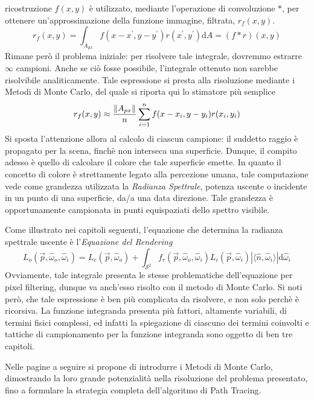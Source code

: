 \documentclass[10pt, openany]{book}
\theoremstyle{theoremdd}
\begin{document}
	ricostruzione $f(x,y)$ \`e utilizzato, mediante l'operazione di convoluzione $*$, per ottenere un'approssimazione della funzione immagine, filtrata,
	$r_f(x,y)$.
	\begin{equation}
		r_f(x,y)=\int_{A_{px}}f(x-x^\prime,y-y^\prime)r(x^\prime,y^\prime)\mathrm{d}A = (f*r)(x,y)
	\end{equation}
	Rimane per\`o il problema iniziale: per risolvere tale integrale, dovremmo estrarre $\infty$ campioni. Anche se ci\`o fosse possibile, l'integrale
	ottenuto non sarebbe risolvibile analiticamente. Tale espressione si presta alla risoluzione mediante i Metodi di Monte Carlo, del quale si 
	riporta qui lo stimatore pi\`u semplice
	\begin{equation}
		r_f(x,y)\approx\frac{\norm{A_{px}}}{n}\sum_{i=1}^{n}f(x-x_i,y-y_i)r(x_i,y_i)
	\end{equation}
	Si sposta l'attenzione allora al calcolo di ciascun campione: il suddetto raggio \`e propagato per la scena, finch\`e non interseca una superficie.
	Dunque, il compito adesso \`e quello di calcolare il colore che tale superficie emette. In quanto il concetto di colore \`e strettamente legato 
	alla percezione umana, tale computazione vede come grandezza utilizzata la \textit{Radianza Spettrale}, potenza uscente o incidente in un punto di 
	una superficie, da/a una data direzione. Tale grandezza \`e opportunamente campionata in punti equispaziati dello spettro visibile.\par 
	Come illustrato nei capitoli seguenti, l'equazione che determina la radianza spettrale uscente \`e l'\textit{Equazione del Rendering}
	\begin{equation}
		L_o(\vec{p},\hat{\omega}_o,\hat{\omega}_i)=L_e(\vec{p},\hat{\omega}_o)+%
			\int_{\mathcal{S}^2}f_r(\vec{p},\hat{\omega}_o,\hat{\omega}_i)L_i(\vec{p},\hat{\omega}_i)|\langle\hat{n},\hat{\omega}_i\rangle|
				\mathrm{d}\hat{\omega}_i
	\end{equation}
	Ovviamente, tale integrale presenta le stesse problematiche dell'equazione per pixel filtering, dunque va anch'esso risolto con il metodo di 
	Monte Carlo. Si noti per\`o, che tale espressione \`e ben pi\`u complicata da risolvere, e non solo perch\`e \`e ricorsiva.
	La funzione integranda presenta pi\`u fattori, altamente variabili, di termini fisici complessi, ed infatti la spiegazione di ciascuno 
	dei termini coinvolti e tattiche di campionamento per la funzione integranda sono oggetto di ben tre capitoli.\par
	Nelle pagine a seguire si propone di introdurre i Metodi di Monte Carlo, dimostrando la loro grande potenzialit\`a nella risoluzione del problema 
	presentato, fino a formulare la strategia completa dell'algoritmo di Path Tracing.
\end{document}
